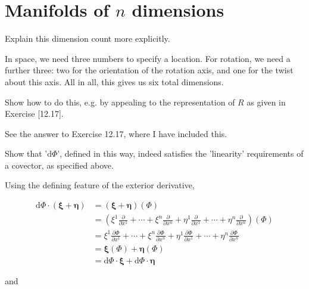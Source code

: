 \documentclass[../the-road-to-reality.tex]{subfiles}
\begin{document}
\section{Manifolds of $n$ dimensions}

\begin{questions}

\question Explain this dimension count more explicitly.

\begin{solution}
        In space, we need three numbers to specify a location. For rotation, we need a further three: two for the orientation of the rotation axis, and one for the twist about this axis. All in all, this gives us six total dimensions.
\end{solution}

\question Show how to do this, e.g. by appealing to the representation of $R$ as given in Exercise [12.17].

\begin{solution}
        See the answer to Exercise 12.17, where I have included this.
\end{solution}

\question Show that '$\mathrm{d}\Phi$', defined in this way, indeed satisfies the 'linearity' requirements of a covector, as specified above.

\begin{solution}
        Using the defining feature of the exterior derivative,

        \begin{align*}
                \mathrm{d}\Phi \cdot (\mathbf{\xi} + \mathbf{\eta}) &= (\mathbf{\xi} + \mathbf{\eta})(\Phi) \\
                &= (\xi^1\frac{\partial}{\partial{x^1}} + \cdots + \xi^n\frac{\partial}{\partial{x^n}} + \eta^1\frac{\partial}{\partial{x^1}} + \cdots + \eta^n\frac{\partial}{\partial{x^n}})(\Phi) \\
                &= \xi^1\frac{\partial\Phi}{\partial{x^1}} + \cdots + \xi^n\frac{\partial\Phi}{\partial{x^n}} + \eta^1\frac{\partial\Phi}{\partial{x^1}} + \cdots + \eta^n\frac{\partial\Phi}{\partial{x^n}} \\
                &= \mathbf{\xi}(\Phi) + \mathbf{\eta}(\Phi) \\
                &= \mathrm{d}\Phi \cdot \mathbf{\xi} + \mathrm{d}\Phi \cdot \mathbf{\eta}
        \end{align*}

        and


\end{solution}
\end{questions}
\end{document}
